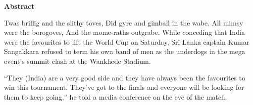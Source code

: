 


\newpage
\begin{center}
\Large \textbf{Abstract}
\end{center}
Twas brillig and the slithy toves, Did gyre and gimball in the wabe.  All mimsy were the borogoves, And the mome-raths outgrabe. While conceding that India were the favourites to lift the World Cup on Saturday, Sri Lanka captain Kumar Sangakkara refused to term his own band of men as the underdogs in the mega event's summit clash at the Wankhede Stadium.

``They (India) are a very good side and they have always been the favourites to win this tournament. They've got to the finals and everyone will be looking for them to keep going,'' he told a media conference on the eve of the match. 

